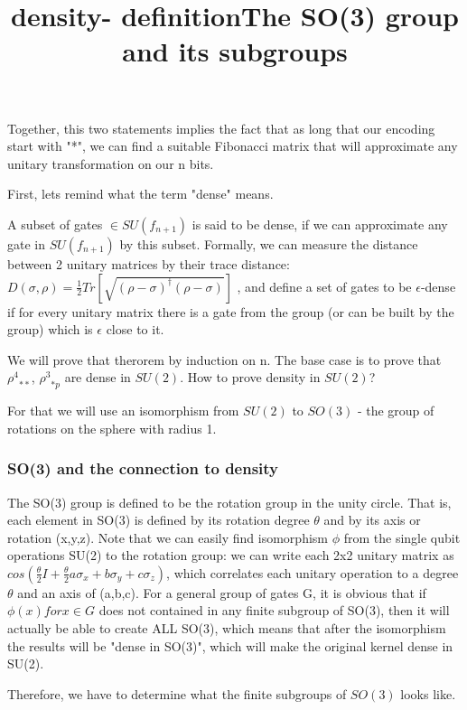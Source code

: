 \documentclass{article}
\begin{document}
Together, this two statements implies the fact that as long that our encoding start with "*", we can find a suitable Fibonacci matrix that will approximate any unitary transformation on our n bits.

First, lets remind what the term "dense" means. 
\title{density- definition}
A subset of gates $\in SU(f_{n+1})$ is said to be dense, if we can approximate any gate in $ SU(f_{n+1})$ by this subset. Formally, we can measure the distance between 2 unitary matrices by their trace distance: 
$D(\sigma, \rho) = \frac{1}{2}Tr[\sqrt{(\rho - \sigma)^{\dagger}(\rho - \sigma)}]$
, and define a set of gates to be $\epsilon$-dense if for every unitary matrix there is a gate from the group (or can be built by the group) which is $\epsilon$ close to it.

We will prove that therorem by induction on n. The base case is to prove that ${\rho^{4}}_{**}$, ${\rho^{3}}_{*p}$ are dense in $SU(2)$. How to prove density in $SU(2)$?

For that we will use an isomorphism from $SU(2)$ to $SO(3)$ - the group of rotations on the sphere with radius 1.


\subsubsection{SO(3) and the connection to density}

\title {The SO(3) group and its subgroups}
The SO(3) group is defined to be the rotation group in the unity circle. That is, each element in SO(3) is defined by its rotation degree $\theta$ and by its axis or rotation (x,y,z). Note that we can easily find isomorphism $\phi$ from the single qubit operations SU(2) to the rotation group: we can write each 2x2 unitary matrix as $cos(\frac{\theta}{2}I + \frac{\theta}{2}{a\sigma_{x} + b\sigma_{y} + c\sigma_{z}})$, which correlates each unitary operation to a degree $\theta$ and an axis of (a,b,c). For a general group of gates G, it is obvious that if ${\phi(x) for x \in G}$ does not contained in any finite subgroup of SO(3), then it will actually be able to create ALL SO(3), which means that after the isomorphism the results will be "dense in SO(3)", which will make the original kernel dense in SU(2).

Therefore, we have to determine what the finite subgroups of $SO(3)$ looks like.
\end{document}
